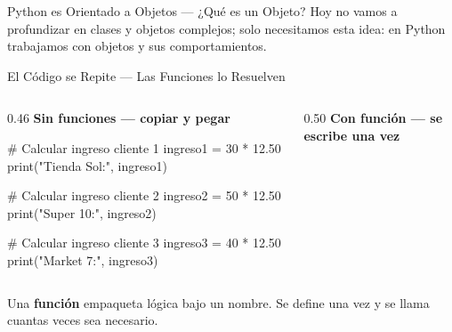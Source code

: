 \documentclass[aspectratio=169, 11pt]{beamer}
\begin{document}
\begin{frame}[fragile,shrink=28]{Python es Orientado a Objetos --- ¿Qué es un Objeto?}
  \vspace{4pt}
  {\footnotesize\color{arcaDark}
    Hoy no vamos a profundizar en clases y objetos complejos;
    solo necesitamos esta idea: en Python trabajamos con
    objetos y sus comportamientos.}
\end{frame}

\begin{frame}[fragile,shrink=25]{El Código se Repite --- Las Funciones lo Resuelven}
  \vspace{-6pt}
  \begin{columns}[T]
    \begin{column}{0.46\textwidth}
      {\scriptsize\color{arcaRed}\bfseries\faTimesCircle\hspace{4pt}
        Sin funciones --- copiar y pegar}
      \begin{pyblock}
# Calcular ingreso cliente 1
ingreso1 = 30 * 12.50
print("Tienda Sol:", ingreso1)

# Calcular ingreso cliente 2
ingreso2 = 50 * 12.50
print("Super 10:", ingreso2)

# Calcular ingreso cliente 3
ingreso3 = 40 * 12.50
print("Market 7:", ingreso3)
      \end{pyblock}
    \end{column}

    \begin{column}{0.50\textwidth}
      {\scriptsize\color{codeGreen}\bfseries\faCheckCircle\hspace{4pt}
        Con función --- se escribe una vez}
    \end{column}
  \end{columns}

  \vspace{6pt}
  {\footnotesize\color{arcaDark}
    Una \textbf{función} empaqueta lógica bajo un nombre.
    Se define una vez y se llama cuantas veces sea necesario.}
\end{frame}
\end{document}
